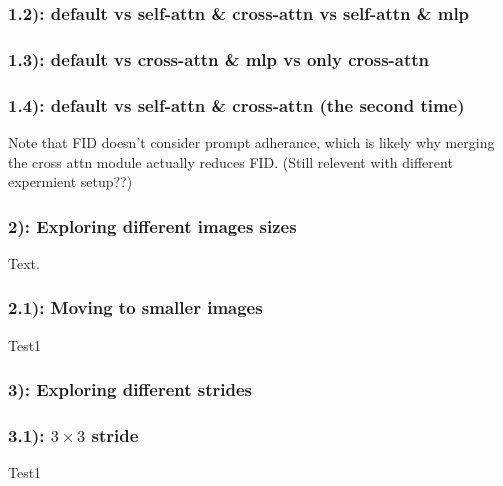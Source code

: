 \newpage
\subsubsection*{1.2): default vs self-attn \& cross-attn vs self-attn \& mlp}
\begin{figure}[!htb]
    
    
\end{figure}

\subsubsection*{1.3): default vs cross-attn \& mlp vs only cross-attn}
\begin{figure}[!htb]
    
    
\end{figure}

\newpage
\subsubsection*{1.4): default vs self-attn \& cross-attn (the second time)}
Note that FID doesn’t consider prompt adherance, which is likely why merging the cross attn module actually reduces FID\cite{bolya2023tomesd}. (Still relevent with different expermient setup??)
\begin{figure}[!htb]
    
    
\end{figure}

\newpage
\subsubsection*{2): Exploring different images sizes}
Text.
\subsubsection*{2.1): Moving to smaller images}
Test1
\begin{figure}[!htb]
    
    
\end{figure}

\newpage
\subsubsection*{3): Exploring different strides}
\subsubsection*{3.1): $3 \times 3$ stride}
Test1
